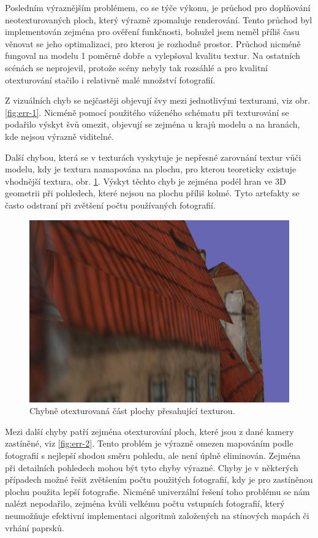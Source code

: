 \documentclass[11pt,twoside,a4paper]{book}
\begin{document}
Posledním výraznějším problémem, co se týče výkonu, je průchod pro doplňování neotexturovaných ploch, který výrazně zpomaluje renderování. Tento průchod byl implementován zejména pro ověření funkčnosti, bohužel jsem neměl příliš času věnovat se jeho optimalizaci, pro kterou je rozhodně prostor. Průchod nicméně fungoval na modelu 1 poměrně dobře a vylepšoval kvalitu textur. Na ostatních scénách se neprojevil, protože scény nebyly tak rozsáhlé a pro kvalitní otexturování stačilo i relativně malé množství fotografií.

Z vizuálních chyb se nejčastěji objevují švy mezi jednotlivými texturami, viz obr. \ref{fig:err-1}. Nicméně pomocí použitého váženého schématu při texturování se podařilo výskyt švů omezit, objevují se zejména u krajů modelu a na hranách, kde nejsou výrazně viditelné. 

Další chybou, která se v texturách vyskytuje je nepřesné zarovnání textur vůči modelu, kdy je textura namapována na plochu, pro kterou teoreticky existuje vhodnější textura, obr. \ref{fig:err-3}. Výskyt těchto chyb je zejména podél hran ve 3D geometrii při pohledech, které nejsou na plochu příliš kolmé. Tyto artefakty se často odstraní při zvětšení počtu používaných fotografií.

\begin{figure}[h!]
\begin{center}
\includegraphics{figures/err-3}
\caption{Chybně otexturovaná část plochy přesahující texturou.}
\label{fig:err-3}
\end{center}
\end{figure}

Mezi další chyby patří zejména otexturování ploch, které jsou z dané kamery zastíněné, viz \ref{fig:err-2}. Tento problém je výrazně omezen mapováním podle fotografií s nejlepší shodou směru pohledu, ale není úplně eliminován. Zejména při detailních pohledech mohou být tyto chyby výrazné. Chyby je v některých případech možné řešit zvětšením počtu použitých fotografií, kdy je pro zastíněnou plochu použita lepší fotografie. Nicméně univerzální řešení toho problému se nám nalézt nepodařilo, zejména kvůli velkému počtu vstupních fotografií, který neumožňuje efektivní implementaci algoritmů založených na stínových mapách či vrhání paprsků.
\end{document}
